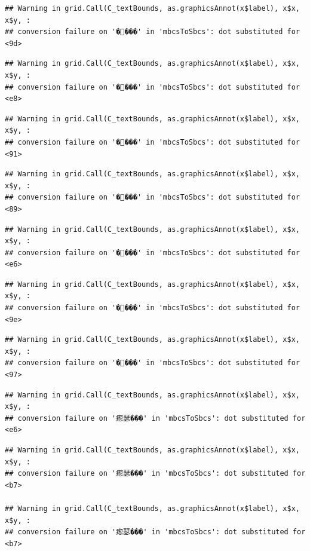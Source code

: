 \documentclass[
]{article}
\begin{document}
\begin{verbatim}
## Warning in grid.Call(C_textBounds, as.graphicsAnnot(x$label), x$x, x$y, :
## conversion failure on '����' in 'mbcsToSbcs': dot substituted for <9d>
\end{verbatim}

\begin{verbatim}
## Warning in grid.Call(C_textBounds, as.graphicsAnnot(x$label), x$x, x$y, :
## conversion failure on '����' in 'mbcsToSbcs': dot substituted for <e8>
\end{verbatim}

\begin{verbatim}
## Warning in grid.Call(C_textBounds, as.graphicsAnnot(x$label), x$x, x$y, :
## conversion failure on '����' in 'mbcsToSbcs': dot substituted for <91>
\end{verbatim}

\begin{verbatim}
## Warning in grid.Call(C_textBounds, as.graphicsAnnot(x$label), x$x, x$y, :
## conversion failure on '����' in 'mbcsToSbcs': dot substituted for <89>
\end{verbatim}

\begin{verbatim}
## Warning in grid.Call(C_textBounds, as.graphicsAnnot(x$label), x$x, x$y, :
## conversion failure on '����' in 'mbcsToSbcs': dot substituted for <e6>
\end{verbatim}

\begin{verbatim}
## Warning in grid.Call(C_textBounds, as.graphicsAnnot(x$label), x$x, x$y, :
## conversion failure on '����' in 'mbcsToSbcs': dot substituted for <9e>
\end{verbatim}

\begin{verbatim}
## Warning in grid.Call(C_textBounds, as.graphicsAnnot(x$label), x$x, x$y, :
## conversion failure on '����' in 'mbcsToSbcs': dot substituted for <97>
\end{verbatim}

\begin{verbatim}
## Warning in grid.Call(C_textBounds, as.graphicsAnnot(x$label), x$x, x$y, :
## conversion failure on '瘛瑟���' in 'mbcsToSbcs': dot substituted for <e6>
\end{verbatim}

\begin{verbatim}
## Warning in grid.Call(C_textBounds, as.graphicsAnnot(x$label), x$x, x$y, :
## conversion failure on '瘛瑟���' in 'mbcsToSbcs': dot substituted for <b7>

## Warning in grid.Call(C_textBounds, as.graphicsAnnot(x$label), x$x, x$y, :
## conversion failure on '瘛瑟���' in 'mbcsToSbcs': dot substituted for <b7>
\end{verbatim}
\end{document}

